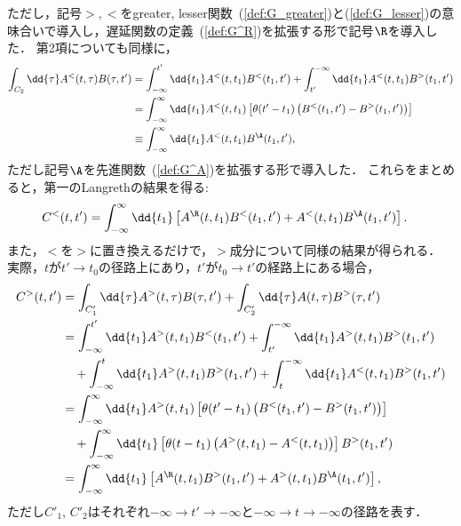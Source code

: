 \documentclass[a4paper,10pt]{jsarticle}
\begin{document}
ただし，記号$>, <$をgreater, lesser関数~(\ref{def:G_greater})と(\ref{def:G_lesser})の意味合いで導入し，遅延関数の定義~(\ref{def:G^R})を拡張する形で記号$\R$を導入した．
第2項についても同様に，
\begin{align*}
\int_{C_2} \dd{\tau} A^{<} (t, \tau) B (\tau, t')
	& = \int_{-\infty}^{t'} \dd{t_1} A^{<} (t, t_1) B^{<} (t_1, t')
		+ \int_{t'}^{-\infty} \dd{t_1} A^{<} (t, t_1) B^{>} (t_1, t')
\\	& = \int_{-\infty}^{\infty} \dd{t_1} A^{<} (t, t_1) \left[ \theta (t' - t_1) \left( B^{<} (t_1, t') - B^{>} (t_1, t') \right) \right]
\\	& \equiv \int_{-\infty}^{\infty} \dd{t_1} A^{<} (t, t_1) B^{\A} (t_1, t')
,\end{align*}
ただし記号$\A$を先進関数~(\ref{def:G^A})を拡張する形で導入した．
これらをまとめると，第一のLangrethの結果を得る:
\begin{align}
C^{<} (t, t')
	& = \int_{-\infty}^{\infty} \dd{t_1} \left[ A^{\R} (t, t_1) B^{<} (t_1, t') + A^{<} (t, t_1) B^{\A} (t_1, t') \right]
\label{eq:C^<}
.\end{align}
また，$<$を$>$に置き換えるだけで，$>$成分について同様の結果が得られる．
実際，$t$が$t' \to t_0$の径路上にあり，$t'$が$t_0 \to t'$の経路上にある場合，
\begin{align*}
C^{>} (t, t')
	& = \int_{C'_1} \dd{\tau} A^{>} (t, \tau) B (\tau, t')
		+ \int_{C'_2} \dd{\tau} A (t, \tau) B^{>} (\tau, t')
\\	& = \int_{-\infty}^{t'} \dd{t_1} A^{>} (t, t_1) B^{<} (t_1, t')
		+ \int_{t'}^{-\infty} \dd{t_1} A^{>} (t, t_1) B^{>} (t_1, t')
\\	& \hspace{1em}
		+ \int_{-\infty}^{t} \dd{t_1} A^{>} (t, t_1) B^{>} (t_1, t')
		+ \int_{t}^{-\infty} \dd{t_1} A^{<} (t, t_1) B^{>} (t_1, t')
\\	& = \int_{-\infty}^{\infty} \dd{t_1} A^{>} (t, t_1) \left[ \theta (t' - t_1) \left( B^{<} (t_1, t') -  B^{>} (t_1, t') \right) \right]
\\	& \hspace{1em}
		+ \int_{-\infty}^{\infty} \dd{t_1} \left[ \theta (t - t_1) \left( A^{>} (t, t_1) - A^{<} (t, t_1) \right) \right] B^{>} (t_1, t')
\\	& = \int_{-\infty}^{\infty} \dd{t_1} \left[ A^{\R} (t, t_1) B^{>} (t_1, t') + A^{>} (t, t_1) B^{\A} (t_1, t') \right]
,\end{align*}
ただし$C'_1$, $C'_2$はそれぞれ$-\infty \to t' \to -\infty$と$-\infty \to t \to -\infty$の径路を表す．
\end{document}

